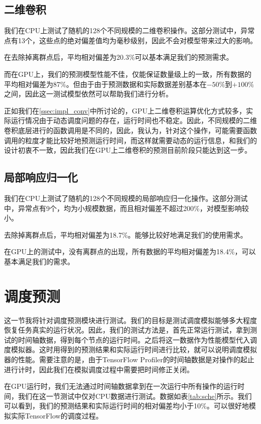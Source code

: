 \subsection{二维卷积}
    我们在CPU上测试了随机的128个不同规模的二维卷积操作。这部分测试中，异常点有13个，这些点的绝对偏差值均为毫秒级别，因此不会对模型带来过大的影响。
    
    在去除掉离群点后，平均相对偏差为20.3\%可以基本满足我们的预测需求。

    而在GPU上，我们的预测模型性能不佳，仅能保证数量级上的一致，所有数据的平均相对偏差为87\%。但由于由于预测数据和实际数据差别基本在$ -50\% $到$ +100\% $之间，因此这一测试模型依然可以帮助我们进行分析。
    
    正如我们在\ref{ssec:impl_conv}中所讨论的，GPU上二维卷积运算优化方式较多，实际运行情况由于动态调度问题的存在，运行时间也不稳定。因此，不同规模的二维卷积底层进行的函数调用是不同的，因此，我认为，针对这个操作，可能需要函数调用的粒度才能比较好地预测运行时间，而这样就需要动态的运行信息，和我们的设计初衷不一致，因此我们在GPU上二维卷积的预测目前阶段只能达到这一步。

\subsection{局部响应归一化}
    我们在CPU上测试了随机的128个不同规模的局部响应归一化操作。这部分测试中，异常点有9个，均为小规模数据，而且相对偏差不超过200\%，对模型影响较小。
    
    去除掉离群点后，平均相对偏差为18.7\%。能够比较好地满足我们的使用需求。
    
    在GPU上的测试中，没有离群点的出现，所有数据的平均相对偏差为18.4\%，可以基本满足我们的需求。

\section{调度预测}
    这一节我将针对调度预测模块进行测试。我们的目标是测试调度模拟能够多大程度恢复任务真实的运行状况。因此，我们的测试方法是，首先正常运行测试，拿到测试的时间轴数据，得到每个节点的运行时间。之后将这一数据作为性能模型代入调度模拟器。这时用得到的预测结果和实际运行时间进行比较，就可以说明调度模拟器的性能。需要注意的是，由于TensorFlow Profiler的时间轴数据是对操作的起止进行计时，因此我们在模拟调度过程中需要把时间修正关闭。
    
    在GPU运行时，我们无法通过时间轴数据拿到在一次运行中所有操作的运行时间，我们在这一节测试中仅对CPU数据进行测试。数据如表\ref{tab:sche}所示。我们可以看到，我们的预测结果和实际运行时间的相对偏差均小于10\%。可以很好地模拟实际TensorFlow的调度过程。
    
